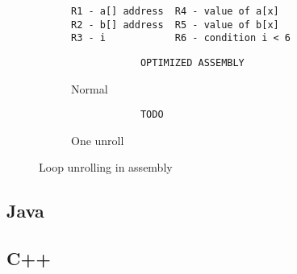 \begin{figure}
    \centering
    \begin{subfigure}{6cm}
        \centering
        \begin{verbatim}
R1 - a[] address  R4 - value of a[x]
R2 - b[] address  R5 - value of b[x]
R3 - i            R6 - condition i < 6
        \end{verbatim}
    \end{subfigure}
    \begin{subfigure}{.5\textwidth}
        \centering
        \begin{verbatim}
            OPTIMIZED ASSEMBLY
        \end{verbatim}
        \caption{Normal}
        \label{fig:sub1}
    \end{subfigure}%
    \begin{subfigure}{.5\textwidth}
        \centering
        \begin{verbatim}
            TODO
        \end{verbatim}
        \caption{One unroll}
        \label{fig:sub2}
    \end{subfigure}
    \caption{Loop unrolling in assembly}
    \label{fig:assembly:optimized}
\end{figure}
\subsection{Java}


\subsection{C++}
